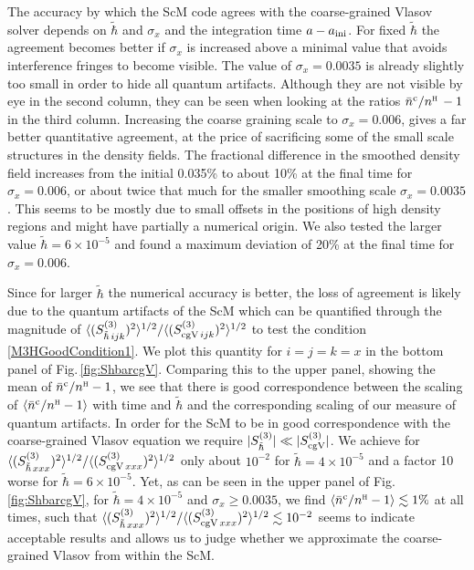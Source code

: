 \documentclass[twocolumn, nofootinbib, showpacs, superscriptaddress]{revtex4-1}
\renewcommand{\H}[0]{{\textsc{h}}}
\newcommand{\sigx}{{\sigma_{\! x}}}
\newcommand{\thbar}{\tilde\hbar}
\renewcommand{\c}[0]{{\rm{c}}}
\begin{document}
 The accuracy by which the ScM code agrees with the coarse-grained Vlasov solver depends on $\thbar$ and $\sigx$ and the integration time $a-a_{\rm ini}$. 
 For fixed $\thbar$ the agreement becomes better if $\sigx$ is increased above a minimal value that avoids interference fringes to become visible. 
 The value of $\sigx=0.0035$ is already slightly too small in order to hide all quantum artifacts.
 Although they are not visible by eye in the second column, they can be seen when looking at the ratios $\bar n^\c/n^\H\,-1$ in the third column.
 Increasing the coarse graining scale to $\sigx=0.006$, gives a far better quantitative agreement, at
 the price of sacrificing some of the small scale structures in the density fields.
 The fractional difference in the smoothed density field increases from the initial 0.035\% to about 10\% at the final time for $\sigx=0.006$, or about twice that much for the smaller smoothing scale $\sigx=0.0035$. This seems to be mostly due to small offsets in the positions of high density regions and might have partially a numerical origin. 
We also tested the larger value $\thbar=6\times10^{-5}$ and found a maximum deviation of 20\% at the final time for $\sigx=0.006$.

 Since for larger $\thbar$ the numerical accuracy is better, the loss of agreement is likely due to the quantum artifacts of the ScM 
which can be quantified through the magnitude 
of $\langle (S^{(3)}_{\thbar\,ijk})^2 \rangle^{1/2}/\langle (S^{(3)}_{{\rm cg V}\,ijk})^2\rangle^{1/2}$ to test the condition \eqref{M3HGoodCondition1}.
 We plot this quantity for $i=j=k=x$ in the bottom panel of Fig.\,\ref{fig:ShbarcgV}.
Comparing this to the upper panel, showing the mean of $\bar n^\c/n^\H -1$, we see that there is good correspondence between the scaling of $\langle \bar n^\c/n^\H -1 \rangle$ with time and $\thbar$ and the corresponding scaling of our measure of quantum artifacts.
In order for the ScM to be in good correspondence with the coarse-grained Vlasov equation we require $ | S^{(3)}_{\thbar}| \ll |S^{(3)}_{\rm cg V}| $. 
We achieve for $\langle (S^{(3)}_{\thbar\,xxx})^2 \rangle^{1/2}/\langle (S^{(3)}_{{\rm cg V}\,xxx})^2\rangle^{1/2}$ only about $10^{-2}$ for $\thbar=4\times 10^{-5}$ and a factor 10 worse for $\thbar=6\times10^{-5}$. 
Yet, as can be seen in the upper panel of Fig.\,\ref{fig:ShbarcgV}, for $\thbar=4\times 10^{-5}$ and $\sigx\geq 0.0035$, we find $\langle \bar n^\c/n^\H -1 \rangle \lesssim 1\%$ at all times, such that $\langle (S^{(3)}_{\thbar\,xxx})^2 \rangle^{1/2}/\langle (S^{(3)}_{{\rm cg V}\,xxx})^2\rangle^{1/2} \lesssim 10^{-2}$ seems to indicate acceptable results and allows us to judge whether we approximate the coarse-grained Vlasov from within the ScM. 
\end{document}
